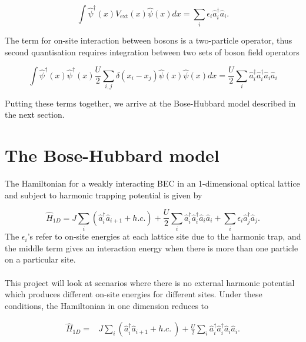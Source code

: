 \documentclass[a4paper,10pt]{article}
\begin{document}
\begin{equation}
 \int  \hat{\psi}^{\dagger}(x) V_{\text{ext}}(x)  \hat{\psi}(x)dx = \sum_i \epsilon_i \hat{a}_i^{\dagger}\hat{a}_i.
\end{equation}

The term for on-site interaction between bosons is a two-particle operator, thus second quantisation requires integration between two sets of boson field operators 

\begin{equation}
 \int  \hat{\psi}^{\dagger}(x)\hat{\psi}^{\dagger}(x) \frac{U}{2}\sum_{i,j}\delta(x_{i}-x_{j})  \hat{\psi}(x) \hat{\psi}(x) dx = \frac{U}{2}\sum_i \hat{a}_i^{\dagger}\hat{a}_i^{\dagger}\hat{a}_i\hat{a}_i
\end{equation}


Putting these terms together, we arrive at the Bose-Hubbard model described in the next section.
\newpage



\newpage
\section{The Bose-Hubbard model}

The Hamiltonian for a weakly interacting BEC in an 1-dimensional optical lattice and subject to harmonic trapping potential is given by

\begin{equation}
 \hat{H}_{1D}=J\sum_{i}(\hat{a}^\dagger_{i}\hat{a}_{i+1}+h.c.)+\frac{U}{2}\sum_{i}\hat{a}^\dagger_{i}\hat{a}^\dagger_{i}\hat{a}_{i}\hat{a}_{i}+\sum_{i}{\epsilon_i}\hat{a}^\dagger_{j}\hat{a}_{j}.
\end{equation}
The $\epsilon_i$'s refer to on-site energies at each lattice site due to the harmonic trap, and the middle term gives an interaction energy when there is more than one particle 
on a particular site.
\\\\
This project will look at scenarios where there is no external harmonic potential which produces different on-site energies for different sites.  
Under these conditions, the Hamiltonian in one dimension reduces to

\begin{equation}
\begin{align*}
\hat{H}_{1D}=&J\sum_{i}(\hat{a}^\dagger_{i}\hat{a}_{i+1}+h.c.\ ) +\frac{U}{2}\sum_{i}\hat{a}^\dagger_{i}\hat{a}^\dagger_{i}\hat{a}_{i}\hat{a}_{i}.
\end{align*}
\end{equation}
\end{document}
